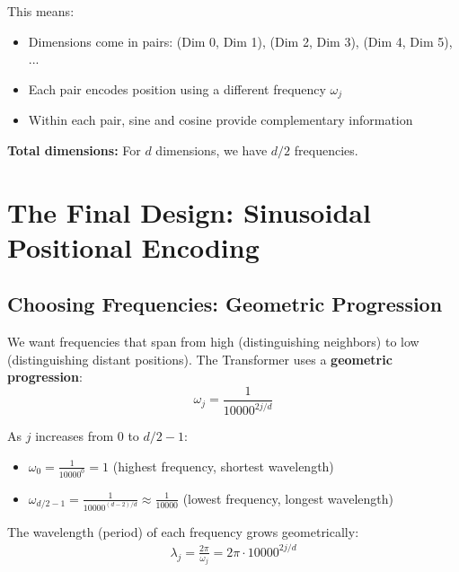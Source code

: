 \documentclass{article}
\begin{document}
This means:
\begin{itemize}
\item Dimensions come in pairs: (Dim 0, Dim 1), (Dim 2, Dim 3), (Dim 4, Dim 5), ...
\item Each pair encodes position using a different frequency $\omega_j$
\item Within each pair, sine and cosine provide complementary information
\end{itemize}

\textbf{Total dimensions:} For $d$ dimensions, we have $d/2$ frequencies.

\section{The Final Design: Sinusoidal Positional Encoding}

\subsection{Choosing Frequencies: Geometric Progression}

We want frequencies that span from high (distinguishing neighbors) to low (distinguishing distant positions). The Transformer uses a \textbf{geometric progression}:
\[
\omega_j = \frac{1}{10000^{2j/d}}
\]

As $j$ increases from $0$ to $d/2 - 1$:
\begin{itemize}
\item $\omega_0 = \frac{1}{10000^{0}} = 1$ (highest frequency, shortest wavelength)
\item $\omega_{d/2-1} = \frac{1}{10000^{(d-2)/d}} \approx \frac{1}{10000}$ (lowest frequency, longest wavelength)
\end{itemize}

The wavelength (period) of each frequency grows geometrically:
\begin{align}
\lambda_j = \frac{2\pi}{\omega_j} = 2\pi \cdot 10000^{2j/d}
\end{align}
\end{document}
